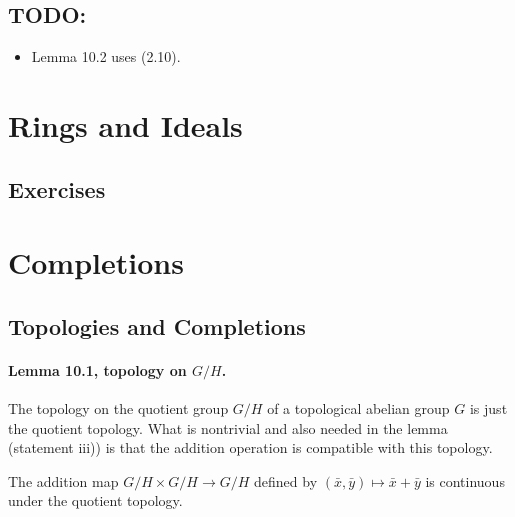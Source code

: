 \documentclass{note}
\begin{document}
\section*{TODO:}

\begin{itemize}
\item Lemma 10.2 uses (2.10).
\end{itemize}


\chapter{Rings and Ideals}

\section*{Exercises}
\setcounter{chapter}{9}


\chapter{Completions}

\section*{Topologies and Completions}
\subsubsection*{Lemma 10.1, topology on $G/H$.}

The topology on the quotient group $G/H$ of a topological abelian
group $G$ is just the quotient topology. What is nontrivial and also
needed in the lemma (statement iii)) is that the addition operation is
compatible with this topology.

\begin{lemma*}
  The addition map $G/H \times G/H \to G/H$ defined by
  $(\bar{x},\bar{y}) \mapsto \bar{x}+\bar{y}$ is continuous under the
  quotient topology.
\end{lemma*}

\end{document}
